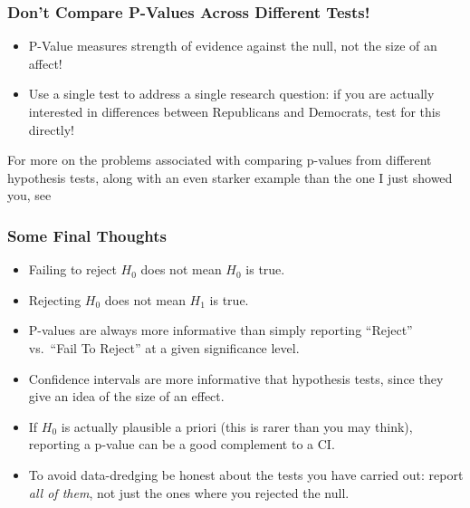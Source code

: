 \documentclass[handout]{beamer}
\begin{document}
\begin{frame}
\frametitle{Don't Compare P-Values Across Different Tests!}

\begin{itemize}
	\item P-Value measures strength of evidence against the null, not the size of an affect! \pause
	\item Use a single test to address a single research question: if you are actually interested in differences between Republicans and Democrats, test for this directly! \pause
\end{itemize}

\vspace{1em}

\pause

For more on the problems associated with comparing p-values from different hypothesis tests, along with an even starker example than the one I just showed you, see \href{http://amstat.tandfonline.com/doi/abs/10.1198/000313006X152649}{\textcolor{blue}{}}

\end{frame}



\begin{frame}
\frametitle{Some Final Thoughts}
	\begin{itemize}
		\item Failing to reject $H_0$ does not mean $H_0$ is true. 
		\item Rejecting $H_0$ does not mean $H_1$ is true.
		\item P-values are always more informative than simply reporting ``Reject'' vs.\ ``Fail To Reject'' at a given significance level. 
		\item Confidence intervals are more informative that hypothesis tests, since they give an idea of the size of an effect. 
		\item If $H_0$ is actually plausible a priori (this is rarer than you may think), reporting a p-value can be a good complement to a CI. 
		\item To avoid data-dredging be honest about the tests you have carried out: report \emph{all of them}, not just the ones where you rejected the null.
	\end{itemize}

\end{frame}
\end{document}
